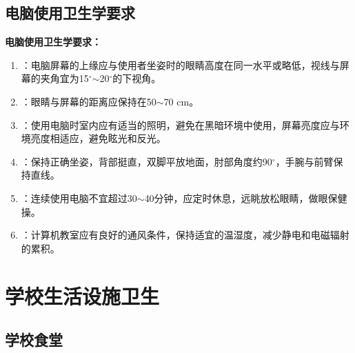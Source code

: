 \subsection{电脑使用卫生学要求}

\begin{keybox}
\textbf{电脑使用卫生学要求：}

\begin{enumerate}[leftmargin=*]
    \item {}：电脑屏幕的上缘应与使用者坐姿时的眼睛高度在同一水平或略低，视线与屏幕的夹角宜为15$^\circ$$\sim$20$^\circ$的下视角。
    \item {}：眼睛与屏幕的距离应保持在50$\sim$70 cm。
    \item {}：使用电脑时室内应有适当的照明，避免在黑暗环境中使用，屏幕亮度应与环境亮度相适应，避免眩光和反光。
    \item {}：保持正确坐姿，背部挺直，双脚平放地面，肘部角度约90$^\circ$，手腕与前臂保持直线。
    \item {}：连续使用电脑不宜超过30$\sim$40分钟，应定时休息，远眺放松眼睛，做眼保健操。
    \item {}：计算机教室应有良好的通风条件，保持适宜的温湿度，减少静电和电磁辐射的累积。
\end{enumerate}
\end{keybox}

\section{学校生活设施卫生}

\subsection{学校食堂}

